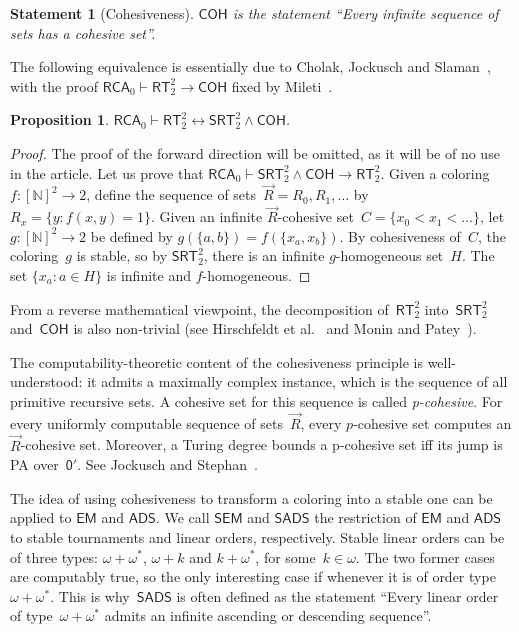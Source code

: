 \documentclass{article}
\numberwithin{theorem}{section}
\newtheorem{proposition}[theorem]{Proposition}
\newtheorem{statement}[theorem]{Statement}
\newcommand{\RCA}{\mathsf{RCA}}
\newcommand{\SRT}{\mathsf{SRT}}
\newcommand{\EM}{\mathsf{EM}}
\newcommand{\SEM}{\mathsf{SEM}}
\newcommand{\ADS}{\mathsf{ADS}}
\newcommand{\SADS}{\mathsf{SADS}}
\newcommand{\COH}{\mathsf{COH}}
\newcommand{\RT}{\mathsf{RT}}
\newcommand{\NN}{\mathbb{N}}
\def\qt#1{``#1''}%
\begin{document}
\begin{statement}[Cohesiveness]
$\COH$ is the statement \qt{Every infinite sequence of sets has a cohesive set}.
\end{statement}

The following equivalence is essentially due to Cholak, Jockusch and Slaman~\cite{cholak_jockusch_slaman_2001}, with the proof $\RCA_0 \vdash \RT^2_2 \to \COH$ fixed by Mileti~\cite[Appendix A]{mileti2004partition}.

\begin{proposition}
$\RCA_0 \vdash \RT^2_2 \leftrightarrow \SRT^2_2 \wedge \COH$.
\end{proposition}
\begin{proof}
The proof of the forward direction will be omitted, as it will be of no use in the article. Let us prove that $\RCA_0 \vdash \SRT^2_2 \wedge \COH \to \RT^2_2$.
Given a coloring $f : [\NN]^2 \to 2$, define the sequence of sets~$\vec{R} = R_0, R_1, \dots$ by $R_x = \{ y : f(x, y) = 1 \}$. Given an infinite $\vec{R}$-cohesive set~$C = \{ x_0 < x_1 < \dots \}$, let $g : [\NN]^2 \to 2$ be defined by $g(\{a, b\}) = f(\{x_a, x_b\})$. By cohesiveness of~$C$, the coloring~$g$ is stable, so by $\SRT^2_2$, there is an infinite $g$-homogeneous set~$H$. 
The set $\{ x_a : a \in H \}$ is infinite and $f$-homogeneous.
\end{proof}

From a reverse mathematical viewpoint, the decomposition of~$\RT^2_2$ into~$\SRT^2_2$ and~$\COH$ is also non-trivial (see Hirschfeldt et al.~\cite{hirschfeldt2008strength} and Monin and Patey~\cite{monin2021srt22}).

The computability-theoretic content of the cohesiveness principle is well-understood: it admits a maximally complex instance, which is the sequence of all primitive recursive sets. A cohesive set for this sequence is called \emph{p-cohesive}. For every uniformly computable sequence of sets~$\vec{R}$, every $p$-cohesive set computes an $\vec{R}$-cohesive set. Moreover, a Turing degree bounds a p-cohesive set iff its jump is PA over~$\mathsf{0}'$. See Jockusch and Stephan~\cite{jockusch1993cohesive}.

The idea of using cohesiveness to transform a coloring into a stable one can be applied to $\EM$ and $\ADS$. We call $\SEM$ and $\SADS$ the restriction of $\EM$ and $\ADS$ to stable tournaments and linear orders, respectively.
Stable linear orders can be of three types: $\omega + \omega^{*}$, $\omega + k$ and $k + \omega^{*}$, for some~$k \in \omega$. The two former cases are computably true, so the only interesting case if whenever it is of order type~$\omega + \omega^{*}$. This is why~$\SADS$ is often defined as the statement \qt{Every linear order of type~$\omega + \omega^{*}$ admits an infinite ascending or descending sequence}.
\end{document}
